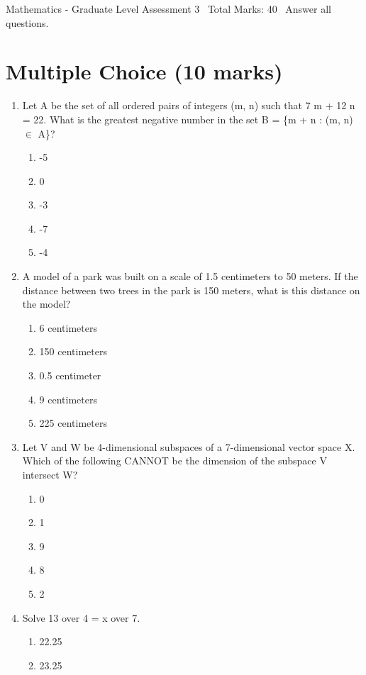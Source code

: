 \documentclass[12pt]{article}
\begin{document}
\begin{center}
Mathematics - Graduate Level Assessment 3 \
Total Marks: 40 \
Answer all questions.
\end{center}

\section*{Multiple Choice (10 marks)}
\begin{enumerate}[label=\arabic*.]
\item Let A be the set of all ordered pairs of integers (m, n) such that 7 m + 12 n = 22. What is the greatest negative number in the set B = \{m + n : (m, n) \ensuremath{\in} A\}?
\begin{enumerate}[label=(\alph*)]
    \item -5
    \item 0
    \item -3
    \item -7
    \item -4
\end{enumerate}
\item A model of a park was built on a scale of 1.5 centimeters to 50 meters. If the distance between two trees in the park is 150 meters, what is this distance on the model?
\begin{enumerate}[label=(\alph*)]
    \item 6 centimeters
    \item 150 centimeters
    \item 0.5 centimeter
    \item 9 centimeters
    \item 225 centimeters
\end{enumerate}
\item Let V and W be 4-dimensional subspaces of a 7-dimensional vector space X. Which of the following CANNOT be the dimension of the subspace V intersect W?
\begin{enumerate}[label=(\alph*)]
    \item 0
    \item 1
    \item 9
    \item 8
    \item 2
\end{enumerate}
\item Solve 13 over 4 = x over 7.
\begin{enumerate}[label=(\alph*)]
    \item 22.25
    \item 23.25

\end{enumerate}
\end{enumerate}
\end{document}
